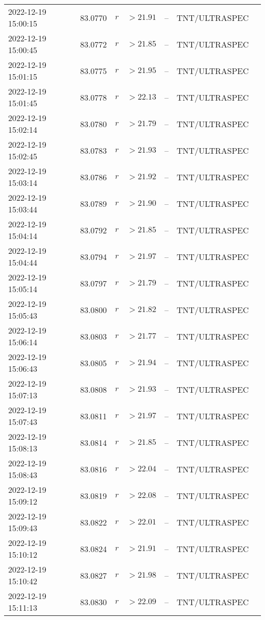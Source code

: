 \documentclass{nature_plusfigure}
\begin{document}
\begin{supplement}
\begin{center}
\begin{longtable}{lllllll}
2022-12-19 15:00:15 & 83.0770 & $r$ & $>21.91$ & -- & TNT/ULTRASPEC &  \\ 
2022-12-19 15:00:45 & 83.0772 & $r$ & $>21.85$ & -- & TNT/ULTRASPEC &  \\ 
2022-12-19 15:01:15 & 83.0775 & $r$ & $>21.95$ & -- & TNT/ULTRASPEC &  \\ 
2022-12-19 15:01:45 & 83.0778 & $r$ & $>22.13$ & -- & TNT/ULTRASPEC &  \\ 
2022-12-19 15:02:14 & 83.0780 & $r$ & $>21.79$ & -- & TNT/ULTRASPEC &  \\ 
2022-12-19 15:02:45 & 83.0783 & $r$ & $>21.93$ & -- & TNT/ULTRASPEC &  \\ 
2022-12-19 15:03:14 & 83.0786 & $r$ & $>21.92$ & -- & TNT/ULTRASPEC &  \\ 
2022-12-19 15:03:44 & 83.0789 & $r$ & $>21.90$ & -- & TNT/ULTRASPEC &  \\ 
2022-12-19 15:04:14 & 83.0792 & $r$ & $>21.85$ & -- & TNT/ULTRASPEC &  \\ 
2022-12-19 15:04:44 & 83.0794 & $r$ & $>21.97$ & -- & TNT/ULTRASPEC &  \\ 
2022-12-19 15:05:14 & 83.0797 & $r$ & $>21.79$ & -- & TNT/ULTRASPEC &  \\ 
2022-12-19 15:05:43 & 83.0800 & $r$ & $>21.82$ & -- & TNT/ULTRASPEC &  \\ 
2022-12-19 15:06:14 & 83.0803 & $r$ & $>21.77$ & -- & TNT/ULTRASPEC &  \\ 
2022-12-19 15:06:43 & 83.0805 & $r$ & $>21.94$ & -- & TNT/ULTRASPEC &  \\ 
2022-12-19 15:07:13 & 83.0808 & $r$ & $>21.93$ & -- & TNT/ULTRASPEC &  \\ 
2022-12-19 15:07:43 & 83.0811 & $r$ & $>21.97$ & -- & TNT/ULTRASPEC &  \\ 
2022-12-19 15:08:13 & 83.0814 & $r$ & $>21.85$ & -- & TNT/ULTRASPEC &  \\ 
2022-12-19 15:08:43 & 83.0816 & $r$ & $>22.04$ & -- & TNT/ULTRASPEC &  \\ 
2022-12-19 15:09:12 & 83.0819 & $r$ & $>22.08$ & -- & TNT/ULTRASPEC &  \\ 
2022-12-19 15:09:43 & 83.0822 & $r$ & $>22.01$ & -- & TNT/ULTRASPEC &  \\ 
2022-12-19 15:10:12 & 83.0824 & $r$ & $>21.91$ & -- & TNT/ULTRASPEC &  \\ 
2022-12-19 15:10:42 & 83.0827 & $r$ & $>21.98$ & -- & TNT/ULTRASPEC &  \\ 
2022-12-19 15:11:13 & 83.0830 & $r$ & $>22.09$ & -- & TNT/ULTRASPEC &  \\ 

\end{longtable}
\end{center}
\end{supplement}
\end{document}

